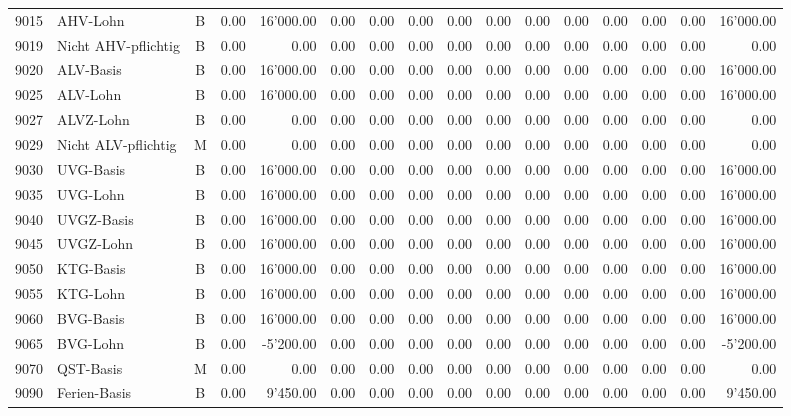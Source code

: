 \documentclass[8pt,a4paper]{extarticle}
\begin{document}
\begin{longtable}{@{\extracolsep{\fill}} l l c r r r r r r r r r r r r r}
9015&AHV-Lohn&B&0.00&16'000.00&0.00&0.00&0.00&0.00&0.00&0.00&0.00&0.00&0.00&0.00&16'000.00\\
9019&Nicht AHV-pflichtig&B&0.00&0.00&0.00&0.00&0.00&0.00&0.00&0.00&0.00&0.00&0.00&0.00&0.00\\
9020&ALV-Basis&B&0.00&16'000.00&0.00&0.00&0.00&0.00&0.00&0.00&0.00&0.00&0.00&0.00&16'000.00\\
9025&ALV-Lohn&B&0.00&16'000.00&0.00&0.00&0.00&0.00&0.00&0.00&0.00&0.00&0.00&0.00&16'000.00\\
9027&ALVZ-Lohn&B&0.00&0.00&0.00&0.00&0.00&0.00&0.00&0.00&0.00&0.00&0.00&0.00&0.00\\
9029&Nicht ALV-pflichtig&M&0.00&0.00&0.00&0.00&0.00&0.00&0.00&0.00&0.00&0.00&0.00&0.00&0.00\\
9030&UVG-Basis&B&0.00&16'000.00&0.00&0.00&0.00&0.00&0.00&0.00&0.00&0.00&0.00&0.00&16'000.00\\
9035&UVG-Lohn&B&0.00&16'000.00&0.00&0.00&0.00&0.00&0.00&0.00&0.00&0.00&0.00&0.00&16'000.00\\
9040&UVGZ-Basis&B&0.00&16'000.00&0.00&0.00&0.00&0.00&0.00&0.00&0.00&0.00&0.00&0.00&16'000.00\\
9045&UVGZ-Lohn&B&0.00&16'000.00&0.00&0.00&0.00&0.00&0.00&0.00&0.00&0.00&0.00&0.00&16'000.00\\
9050&KTG-Basis&B&0.00&16'000.00&0.00&0.00&0.00&0.00&0.00&0.00&0.00&0.00&0.00&0.00&16'000.00\\
9055&KTG-Lohn&B&0.00&16'000.00&0.00&0.00&0.00&0.00&0.00&0.00&0.00&0.00&0.00&0.00&16'000.00\\
9060&BVG-Basis&B&0.00&16'000.00&0.00&0.00&0.00&0.00&0.00&0.00&0.00&0.00&0.00&0.00&16'000.00\\
9065&BVG-Lohn&B&0.00&-5'200.00&0.00&0.00&0.00&0.00&0.00&0.00&0.00&0.00&0.00&0.00&-5'200.00\\
9070&QST-Basis&M&0.00&0.00&0.00&0.00&0.00&0.00&0.00&0.00&0.00&0.00&0.00&0.00&0.00\\
9090&Ferien-Basis&B&0.00&9'450.00&0.00&0.00&0.00&0.00&0.00&0.00&0.00&0.00&0.00&0.00&9'450.00\\

\end{longtable}
\pagebreak
\end{document}
